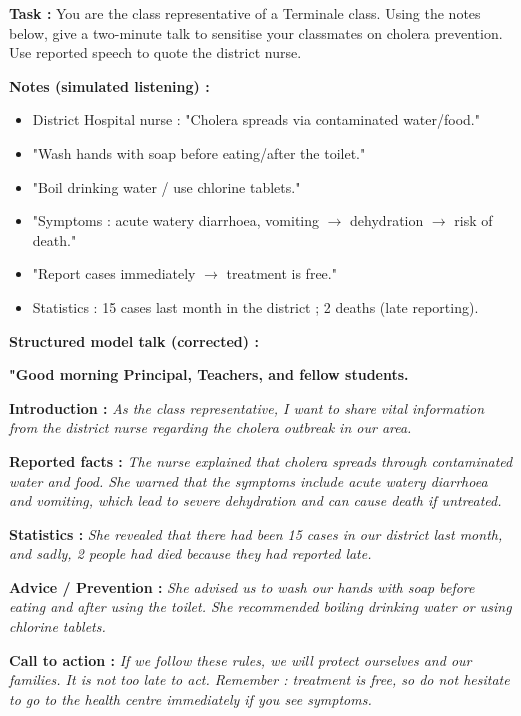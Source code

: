 \documentclass[11pt]{article}
\newcommand{\cle}[1]{{\popxbold\color{popdark}#1}}
\begin{document}
\begin{exoresolu}
\textbf{Task :} You are the class representative of a Terminale class. Using the notes below, give a two-minute talk to sensitise your classmates on cholera prevention. Use reported speech to quote the district nurse.

\textbf{Notes (simulated listening) :}
\begin{itemize}
    \item District Hospital nurse : "Cholera spreads via contaminated water/food."
    \item "Wash hands with soap before eating/after the toilet."
    \item "Boil drinking water / use chlorine tablets."
    \item "Symptoms : acute watery diarrhoea, vomiting $\rightarrow$ dehydration $\rightarrow$ risk of death."
    \item "Report cases immediately $\rightarrow$ treatment is free."
    \item Statistics : 15 cases last month in the district ; 2 deaths (late reporting).
\end{itemize}

\tcblower
\textbf{Structured model talk (corrected) :}

\textbf{"Good morning Principal, Teachers, and fellow students.}

\textbf{Introduction :} \textit{As the class representative, I want to share vital information from the district nurse regarding the cholera outbreak in our area.}

\textbf{Reported facts :} \textit{The nurse \cle{explained that} cholera \cle{spreads} through contaminated water and food. She \cle{warned} that the symptoms include acute watery diarrhoea and vomiting, \cle{which} lead to severe dehydration and can cause death if untreated.}

\textbf{Statistics :} \textit{She \cle{revealed that} there \cle{had been} 15 cases in our district last month, and sadly, 2 people \cle{had died} because they \cle{had reported} late.}

\textbf{Advice / Prevention :} \textit{She \cle{advised} us \cle{to wash} our hands with soap before eating and after using the toilet. She \cle{recommended boiling} drinking water or using chlorine tablets.}

\textbf{Call to action :} \textit{\cle{If we follow} these rules, we \cle{will protect} ourselves and our families. \cle{It is not too late to act}. Remember : treatment is free, so \cle{do not hesitate to go} to the health centre immediately if you see symptoms.}


\end{exoresolu}
\end{document}
